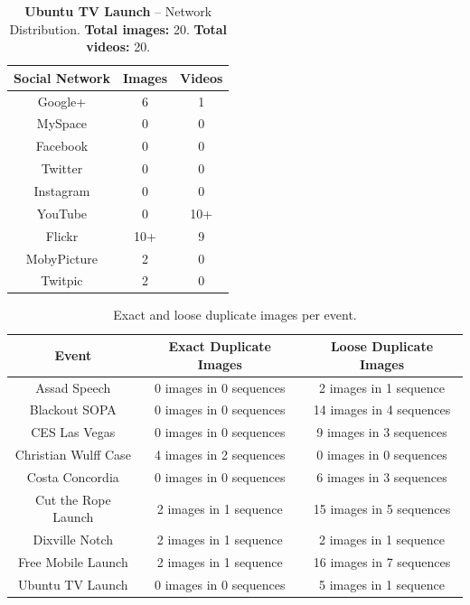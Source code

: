 \documentclass{acm_proc_article-sp}
\begin{document}
\begin{table}[htbp]
  \begin{tabular}{ | c | c | c | }
    \hline
    \textbf{Social Network} & \textbf{Images} & \textbf{Videos}\\
    \hline
    Google+ & 6 & 1\\
    MySpace & 0 & 0\\
    Facebook & 0 & 0\\
    Twitter & 0 & 0\\
    Instagram & 0 & 0\\
    YouTube & 0 & 10+\\
    Flickr & 10+ & 9\\ 
    MobyPicture & 2 & 0\\
    Twitpic & 2 & 0\\
    \hline
  \end{tabular}
  \label{tab:ubuntutv}
  \caption{\textbf{Ubuntu TV Launch} -- Network Distribution. \textbf{Total images:} 20. \textbf{Total videos:} 20.}
\end{table}

\begin{table}[htbp]
  \begin{tabular}{ | c | c | c | }
    \hline
    \textbf{Event} & \textbf{Exact Duplicate Images} & \textbf{Loose Duplicate Images}\\
    \hline
    Assad Speech & 0 images in 0 sequences & 2 images in 1 sequence\\
    Blackout SOPA & 0 images in 0 sequences & 14 images in 4 sequences\\
    CES Las Vegas & 0 images in 0 sequences & 9 images in 3 sequences\\
    Christian Wulff Case & 4 images in 2 sequences & 0 images in 0 sequences\\
    Costa Concordia & 0 images in 0 sequences & 6 images in 3 sequences\\
    Cut the Rope Launch & 2 images in 1 sequence & 15 images in 5 sequences\\
    Dixville Notch & 2 images in 1 sequence & 2 images in 1 sequence\\
    Free Mobile Launch & 2 images in 1 sequence & 16 images in 7 sequences\\
    Ubuntu TV Launch & 0 images in 0 sequences & 5 images in 1 sequence\\
    \hline
  \end{tabular}
  \label{tab:duplicateimages}
  \caption{Exact and loose duplicate images per event.}
\end{table}
\end{document}
